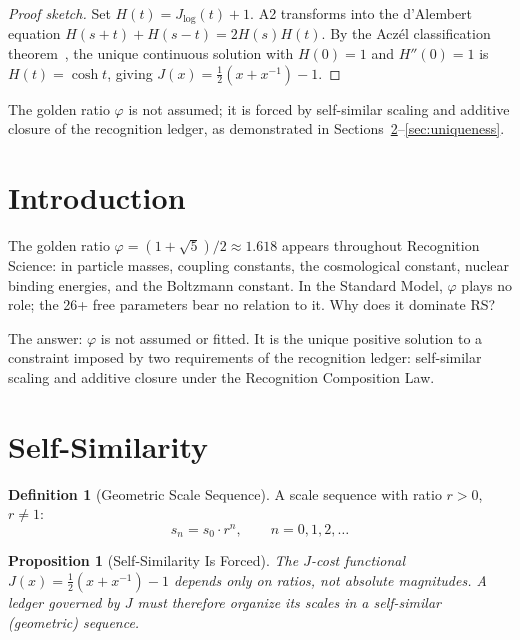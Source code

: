 \documentclass[12pt,a4paper]{article}
\newtheorem{proposition}[theorem]{Proposition}
\theoremstyle{definition}
\newtheorem{definition}[theorem]{Definition}
\theoremstyle{remark}
\begin{document}
\begin{proof}[Proof sketch]
Set $H(t) = J_{\log}(t)+1$.  A2 transforms into the d'Alembert
equation $H(s+t)+H(s-t)=2H(s)H(t)$.  By the Acz\'el classification
theorem~\cite{Aczel1966}, the unique continuous solution with
$H(0)=1$ and $H''(0)=1$ is $H(t)=\cosh t$, giving
$J(x)=\tfrac{1}{2}(x+x^{-1})-1$.
\end{proof}

\noindent The golden ratio $\varphi$ is not assumed; it is forced by
self-similar scaling and additive closure of the recognition ledger,
as demonstrated in Sections~\ref{sec:self-similar}--\ref{sec:uniqueness}.

\section{Introduction}
\label{sec:intro}

The golden ratio $\varphi = (1 + \sqrt{5})/2 \approx 1.618$
appears throughout Recognition Science: in particle masses,
coupling constants, the cosmological constant, nuclear binding
energies, and the Boltzmann constant.  In the Standard Model,
$\varphi$ plays no role; the 26+ free parameters bear no
relation to it.  Why does it dominate RS?

The answer: $\varphi$ is not assumed or fitted.  It is the unique
positive solution to a constraint imposed by two requirements
of the recognition ledger: self-similar scaling and additive
closure under the Recognition Composition Law.

\section{Self-Similarity}
\label{sec:self-similar}

\begin{definition}[Geometric Scale Sequence]
\label{def:scale}
A scale sequence with ratio $r > 0$, $r \neq 1$:
\begin{equation}
  s_n = s_0 \cdot r^n, \qquad n = 0, 1, 2, \ldots
\end{equation}
\end{definition}

\begin{proposition}[Self-Similarity Is Forced]
\label{prop:self-sim}
The $J$-cost functional $J(x) = \tfrac{1}{2}(x + x^{-1}) - 1$
depends only on ratios, not absolute magnitudes.  A ledger
governed by $J$ must therefore organize its scales in a
self-similar (geometric) sequence.
\end{proposition}
\end{document}
